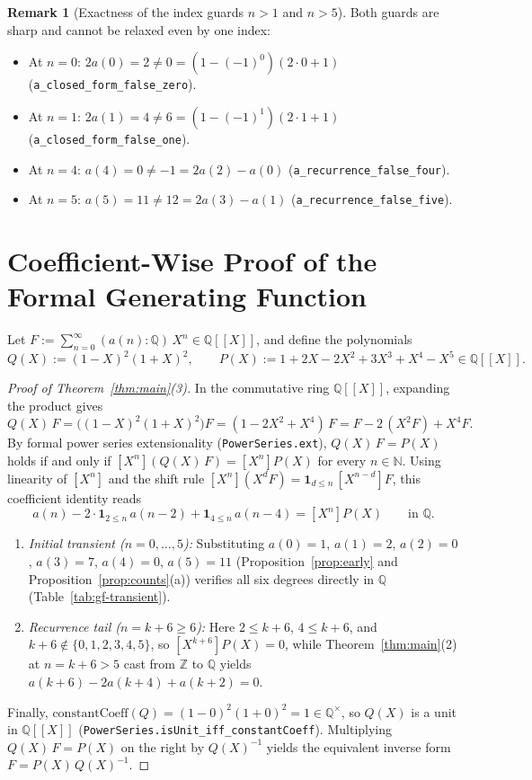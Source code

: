 \documentclass[11pt]{article}
\newcommand{\llbracket}{[\![}
\newcommand{\rrbracket}{]\!]}
\theoremstyle{definition}
\newtheorem{remark}[theorem]{Remark}
\newcommand{\N}{\mathbb{N}}
\newcommand{\Z}{\mathbb{Z}}
\newcommand{\Q}{\mathbb{Q}}
\begin{document}
\begin{remark}[Exactness of the index guards $n > 1$ and $n > 5$]
Both guards are sharp and cannot be relaxed even by one index:
\begin{itemize}
\item At $n = 0$: $2a(0) = 2 \ne 0 = (1 - (-1)^0)(2\cdot 0 + 1)$ (\texttt{a\_closed\_form\_false\_zero}).
\item At $n = 1$: $2a(1) = 4 \ne 6 = (1 - (-1)^1)(2\cdot 1 + 1)$ (\texttt{a\_closed\_form\_false\_one}).
\item At $n = 4$: $a(4) = 0 \ne -1 = 2a(2) - a(0)$ (\texttt{a\_recurrence\_false\_four}).
\item At $n = 5$: $a(5) = 11 \ne 12 = 2a(3) - a(1)$ (\texttt{a\_recurrence\_false\_five}).
\end{itemize}
\end{remark}

\section{Coefficient-Wise Proof of the Formal Generating Function}

Let $F := \sum_{n=0}^{\infty} (a(n) : \Q)\,X^n \in \Q\llbracket X \rrbracket$, and define the polynomials
\[
Q(X) := (1 - X)^2 (1 + X)^2, \qquad P(X) := 1 + 2X - 2X^2 + 3X^3 + X^4 - X^5 \in \Q\llbracket X \rrbracket.
\]

\begin{proof}[Proof of Theorem~\ref{thm:main}(3)]
In the commutative ring $\Q\llbracket X \rrbracket$, expanding the product gives
\[
Q(X)\,F = \bigl((1 - X)^2(1 + X)^2\bigr) F = (1 - 2X^2 + X^4)\,F = F - 2\,(X^2 F) + X^4 F.
\]
By formal power series extensionality (\texttt{PowerSeries.ext}), $Q(X)\,F = P(X)$ holds if and only if $[X^n](Q(X)\,F) = [X^n]P(X)$ for every $n \in \N$. Using linearity of $[X^n]$ and the shift rule $[X^n](X^d F) = \mathbf{1}_{d \le n}\,[X^{n - d}]F$, this coefficient identity reads
\begin{equation}
\label{eq:coeff-goal}
a(n) - 2\cdot\mathbf{1}_{2 \le n}\,a(n - 2) + \mathbf{1}_{4 \le n}\,a(n - 4) = [X^n]P(X) \qquad \text{in } \Q.
\end{equation}
\begin{enumerate}
\item \emph{Initial transient ($n = 0, \dots, 5$):} Substituting $a(0) = 1$, $a(1) = 2$, $a(2) = 0$, $a(3) = 7$, $a(4) = 0$, $a(5) = 11$ (Proposition~\ref{prop:early} and Proposition~\ref{prop:counts}(a)) verifies all six degrees directly in $\Q$ (Table~\ref{tab:gf-transient}).
\item \emph{Recurrence tail ($n = k + 6 \ge 6$):} Here $2 \le k + 6$, $4 \le k + 6$, and $k + 6 \notin \{0, 1, 2, 3, 4, 5\}$, so $[X^{k+6}]P(X) = 0$, while Theorem~\ref{thm:main}(2) at $n = k + 6 > 5$ cast from $\Z$ to $\Q$ yields $a(k + 6) - 2a(k + 4) + a(k + 2) = 0$.
\end{enumerate}
Finally, $\mathrm{constantCoeff}(Q) = (1 - 0)^2(1 + 0)^2 = 1 \in \Q^\times$, so $Q(X)$ is a unit in $\Q\llbracket X \rrbracket$ (\texttt{PowerSeries.isUnit\_iff\_constantCoeff}). Multiplying $Q(X)\,F = P(X)$ on the right by $Q(X)^{-1}$ yields the equivalent inverse form $F = P(X)\,Q(X)^{-1}$.
\end{proof}
\end{document}
